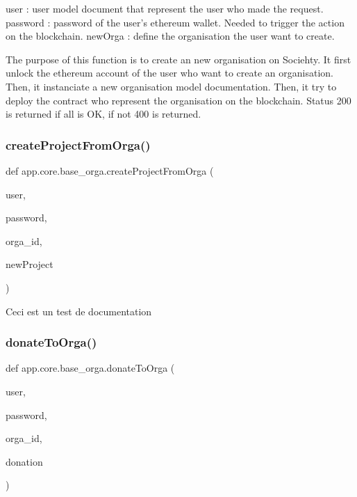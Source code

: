 \begin{DoxyVerb}user : user model document that represent the user who made the request.
password : password of the user's ethereum wallet. Needed to trigger the action on the blockchain.
newOrga : define the organisation the user want to create.

The purpose of this function is to create an new organisation on Sociehty.
It first unlock the ethereum account of the user who want to create an organisation.
Then, it instanciate a new organisation model documentation.
Then, it try to deploy the contract who represent the organisation on the blockchain.
Status 200 is returned if all is OK, if not 400 is returned.
\end{DoxyVerb}
 \mbox{\label{namespaceapp_1_1core_1_1base__orga_a57934420089a447f535554b1067fa853}} 
\subsubsection{\texorpdfstring{create\+Project\+From\+Orga()}{createProjectFromOrga()}}
{\footnotesize\ttfamily def app.\+core.\+base\+\_\+orga.\+create\+Project\+From\+Orga (\begin{DoxyParamCaption}\item[{}]{user,  }\item[{}]{password,  }\item[{}]{orga\+\_\+id,  }\item[{}]{new\+Project }\end{DoxyParamCaption})}

\begin{DoxyVerb}Ceci est un test de documentation
\end{DoxyVerb}
 \mbox{\label{namespaceapp_1_1core_1_1base__orga_a0b363c7014b086738ef903e369e87afa}} 
\subsubsection{\texorpdfstring{donate\+To\+Orga()}{donateToOrga()}}
{\footnotesize\ttfamily def app.\+core.\+base\+\_\+orga.\+donate\+To\+Orga (\begin{DoxyParamCaption}\item[{}]{user,  }\item[{}]{password,  }\item[{}]{orga\+\_\+id,  }\item[{}]{donation }\end{DoxyParamCaption})}

